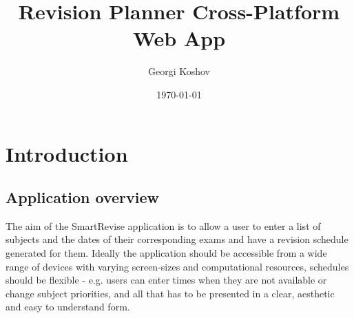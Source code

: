 \documentclass[bsc,frontabs,twoside,singlespacing,parskip]{infthesis}     %
\begin{document}
\title{Revision Planner Cross-Platform Web App}

\author{Georgi Koshov}



\date{\today}


\maketitle


\tableofcontents



\chapter{Introduction}

		

	\section{Application overview}
	
	The aim of the SmartRevise application is to allow a user to enter a list of subjects and the dates of their corresponding exams and have a revision schedule generated for them. Ideally the application should be accessible from a wide range of devices with varying screen-sizes and computational resources, schedules should be flexible - e.g. users can enter times when they are not available or change subject priorities, and all that has to be presented in a clear, aesthetic and easy to understand form.
	
\end{document}
